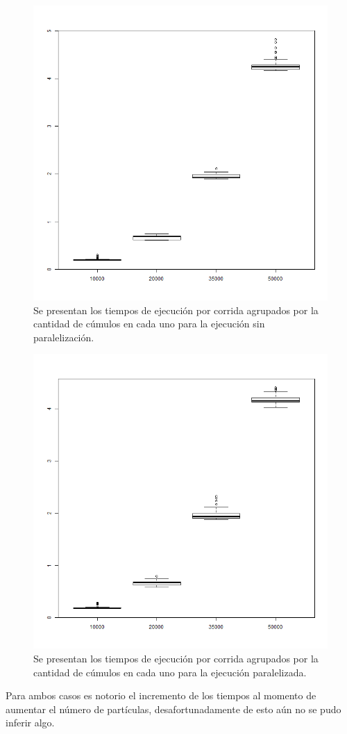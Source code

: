 \documentclass[a4paper]{article}
\begin{document}
\begin{figure}[h]
\centering
\includegraphics[width=0.7\linewidth]{Vnoparalelo}
\caption{Se presentan los tiempos de ejecución por corrida agrupados por la cantidad de cúmulos en cada uno para la ejecución sin paralelización.}
\label{fig:Vnoparalelo}
\end{figure}

\begin{figure}[h]
\centering
\includegraphics[width=0.7\linewidth]{Vparalelo}
\caption{Se presentan los tiempos de ejecución por corrida agrupados por la cantidad de cúmulos en cada uno para la ejecución paralelizada.}
\label{fig:Vparalelo}
\end{figure}

Para ambos casos es notorio el incremento de los tiempos al momento de aumentar el número de partículas, desafortunadamente de esto aún no se pudo inferir algo.
\end{document}
